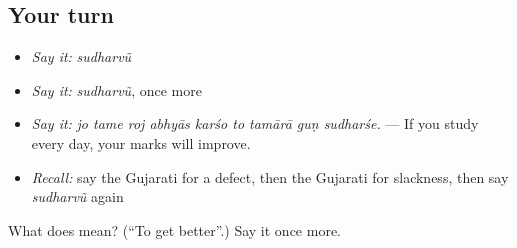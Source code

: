 \subsection*{Your turn}
\begin{itemize}
\raggedright
  \item \emph{Say it:} \emph{sudharvũ}
  \item \emph{Say it:} \emph{sudharvũ}, once more
  \item \emph{Say it:} \emph{jo tame roj abhyās karśo to tamārā guṇ sudharśe.} — If you study every day, your marks will improve.
  \item \emph{Recall:} say the Gujarati for a defect, then the Gujarati for slackness, then say \emph{sudharvũ} again
\end{itemize}

\begin{tcolorbox}[breakable,colback=teal!4,colframe=teal!35!black,title={Before you move on}]
What does  mean? (\textquotedblleft{}To get better\textquotedblright{}.) Say it once more.
\end{tcolorbox}
